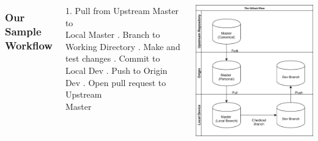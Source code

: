 \documentclass[unknownkeysallowed]{beamer}
\begin{document}
\begin{frame}
    \vspace{1cm}
	\begin{columns}
		\column{2.5in}
    \frametitle{Our Sample Workflow}
        1. Pull from Upstream Master to \\
        Local Master \linebreak{}. Branch to Working Directory \linebreak{}. Make and test changes \linebreak{}. Commit to Local Dev \linebreak{}. Push to Origin Dev \linebreak{}. Open pull request to Upstream \\
        Master
	\column{2.25in}
	\begin{center}
	\includegraphics[width = .9\linewidth]{assets/gitflow5}
	\end{center}
	\end{columns}
    \vspace{1cm}
\end{frame}
\end{document}
